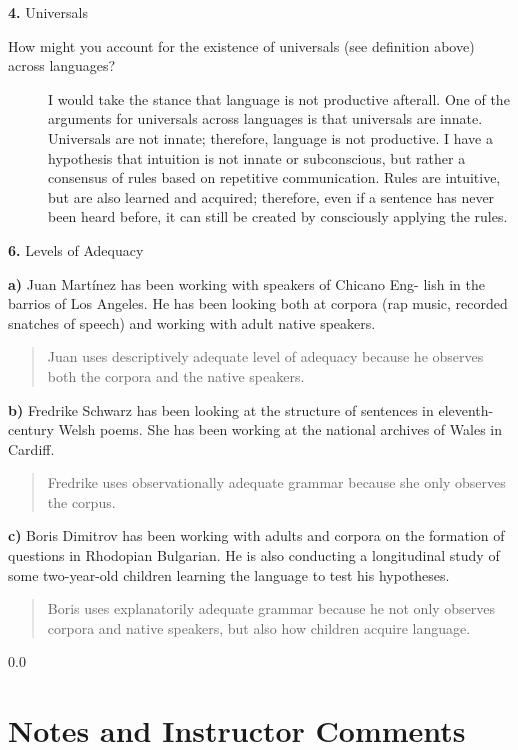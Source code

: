 \documentclass[11pt,notitlepage]{article}
\newcommand{\question}[2]{\textbf{#1.} #2}
\newcommand{\subquestion}[2]{\par\hspace{0.5cm} \textbf{#1)} #2}
\begin{document}
\question{4}{Universals}

\begin{description}
  \item[How might you account for the existence of universals (see
    definition above) across languages?] I would take the stance that
    language is not productive afterall. One of the arguments for
    universals across languages is that universals are
    innate. Universals are not innate; therefore, language is not
    productive. I have a hypothesis that intuition is not innate or
    subconscious, but rather a consensus of rules based on repetitive
    communication. Rules are intuitive, but are also
    learned and acquired; therefore, even if a sentence has never been
    heard before, it can still be created by consciously applying the rules.  
\end{description}

\question{6}{Levels of Adequacy}

\subquestion{a}{Juan Martínez has been working with speakers of
  Chicano Eng- lish in the barrios of Los Angeles. He has been looking
  both at corpora (rap music, recorded snatches of speech) and working
  with adult native speakers.}
\begin{quote} Juan uses descriptively adequate level of adequacy
  because he observes both the corpora and the native speakers.
\end{quote}

\subquestion{b}{Fredrike Schwarz has been looking at the structure of sentences in eleventh-century Welsh poems. She has been working at the national archives of Wales in Cardiff.}
\begin{quote}
Fredrike uses observationally adequate grammar because she only
observes the corpus.
\end{quote}

\subquestion{c}{Boris Dimitrov has been working with adults and corpora on the formation of questions in Rhodopian Bulgarian. He is also conducting a longitudinal study of some two-year-old children learning the language to test his hypotheses.}
\begin{quote}
  Boris uses explanatorily adequate grammar because he not only
  observes corpora and native speakers, but also how children acquire language.
\end{quote}

\newpage
  {\setlength{\baselineskip}%
           {0.0\baselineskip}
  \section*{Notes and Instructor Comments}
  \hrulefill \par}
\end{document}
